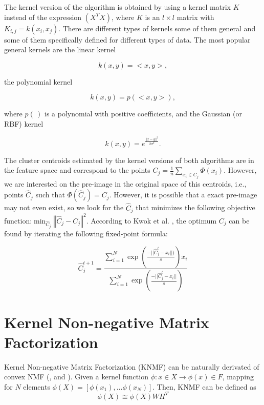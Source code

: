\documentclass[letterpaper,12pt]{article}
\begin{document}
The kernel version of the algorithm is obtained by using a kernel matrix $K$ instead of the expression $(X^{T}X)$, where $K$ is an
$l\times l$ matrix with $K_{i,j}=k(x_{i},x_{j}).$ There are different types of kernels some of them general and some of them specifically defined for different types of data. The most popular general kernels are the linear kernel 

\begin{equation}
k(x,y)=<x,y>,\label{eq:id-kernel}
\end{equation}

 the polynomial kernel 
 
\[
k(x,y)=p(<x,y>),
\]

 where $p(\,)$ is a polynomial with positive coefficients, and the Gaussian (or RBF) kernel 
 
\begin{equation}
k(x,y)=e^{\frac{\left\Vert x-y\right\Vert ^{2}}{2\sigma^{2}}}.\label{eq:Gaussian-kernel}
\end{equation}


The cluster centroids estimated by the kernel versions of both algorithms are in the feature space and correspond to the points $C_{j}=\frac{1}{n}\sum_{x_{i}\in C_{j}}\Phi(x_{i})$. However, we are interested on the pre-image in the original space of this centroids, i.e., points $\hat{C}_{j}$ such that $\Phi(\hat{C}_{j})=C_{j}$. However, it is possible that a exact pre-image may not even exist, so we look for the $\hat{C}_{j}$ that minimizes the following objective function:$\min_{\hat{C}_{j}}\left\Vert \hat{C}_{j}-C_{j}\right\Vert ^{2}$. According to Kwok et al. \cite{kwok2004preimage}, the optimum $C_{j}$ can be found by iterating the following fixed-point formula:

\begin{equation}
\hat{C}_{j}^{t+1}=\frac{\sum_{i=1}^{N}\exp(\frac{-||\hat{C}_{j}^{t}-x_{i}||)}{s})x_{i}}{\sum_{i=1}^{N}\exp(\frac{-||\hat{C}_{j}^{t}-x_{i}||}{s})}\label{eq:back-projection}
\end{equation}


\section{Kernel Non-negative Matrix Factorization}

Kernel Non-negative Matrix Factorization (KNMF) can be naturally derivated of convex NMF (\cite{Kulis2006}, \cite{Li2005} and \cite{Rosipal2001}). Given a kernel function $\phi:x\in X \rightarrow \phi(x)\in F $, mapping for $N$ elements $\phi(X) = [ \phi(x_1),\ldots \phi(x_N) ]$. Then, KNMF can be defined as
\begin{equation}
 \phi(X)\cong\phi(X)WH^T
\end{equation}\label{eq:KNMF}
\end{document}
